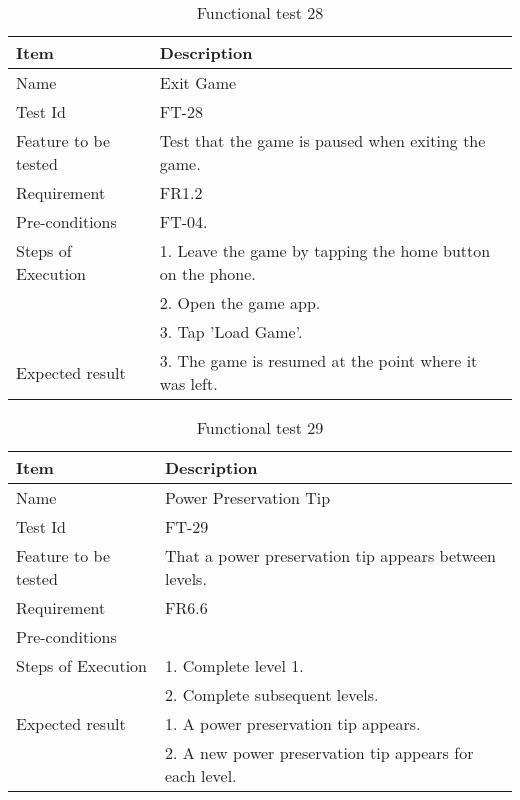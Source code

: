 \begin{table}[H]
\centering
	\begin{tabular}{ l | p{8cm} }
		\hline
		{\bf Item} & {\bf Description} \\ \hline
		Name & Exit Game \\ 
		Test Id & FT-28 \\ 
		Feature to be tested & Test that the game is paused when exiting the game. \\ 
		Requirement & FR1.2 \\ 
		Pre-conditions & FT-04. \\ 
		Steps of Execution & 1. Leave the game by tapping the home button on the phone. \\
		& 2. Open the game app. \\
		& 3. Tap 'Load Game'. \\
		Expected result & 3. The game is resumed at the point where it was left. \\  
	\end{tabular}
	\caption{Functional test 28}
\end{table}

\begin{table}[H]
\centering
	\begin{tabular}{ l | p{8cm} }
		\hline
		{\bf Item} & {\bf Description} \\ \hline
		Name & Power Preservation Tip \\ 
		Test Id & FT-29 \\ 
		Feature to be tested & That a power preservation tip appears between levels. \\ 
		Requirement & FR6.6 \\ 
		Pre-conditions & \\ 
		Steps of Execution & 1. Complete level 1. \\
		& 2. Complete subsequent levels. \\
		Expected result & 1. A power preservation tip appears. \\
		& 2. A new power preservation tip appears for each level. \\
	\end{tabular}
	\caption{Functional test 29}
\end{table}



